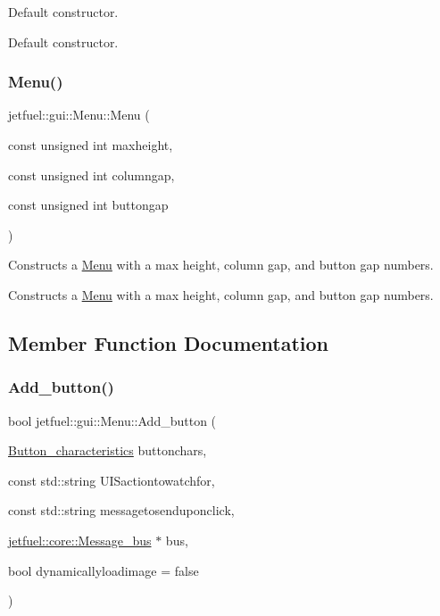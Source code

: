 Default constructor. 

Default constructor. \mbox{\label{classjetfuel_1_1gui_1_1Menu_ae09bc951a919594033f94c5d827889d1}} 
\subsubsection{\texorpdfstring{Menu()}{Menu()}\hspace{0.1cm}{\footnotesize\ttfamily [2/2]}}
{\footnotesize\ttfamily jetfuel\+::gui\+::\+Menu\+::\+Menu (\begin{DoxyParamCaption}\item[{const unsigned int}]{maxheight,  }\item[{const unsigned int}]{columngap,  }\item[{const unsigned int}]{buttongap }\end{DoxyParamCaption})\hspace{0.3cm}{\ttfamily [inline]}}



Constructs a \hyperlink{classjetfuel_1_1gui_1_1Menu}{Menu} with a max height, column gap, and button gap numbers. 

Constructs a \hyperlink{classjetfuel_1_1gui_1_1Menu}{Menu} with a max height, column gap, and button gap numbers. 

\subsection{Member Function Documentation}
\mbox{\label{classjetfuel_1_1gui_1_1Menu_a6f0162b01dbf0bd6bf65cfb3712499fc}} 
\subsubsection{\texorpdfstring{Add\+\_\+button()}{Add\_button()}}
{\footnotesize\ttfamily bool jetfuel\+::gui\+::\+Menu\+::\+Add\+\_\+button (\begin{DoxyParamCaption}\item[{\hyperlink{structjetfuel_1_1gui_1_1Menu_1_1Button__characteristics}{Button\+\_\+characteristics}}]{buttonchars,  }\item[{const std\+::string}]{U\+I\+Sactiontowatchfor,  }\item[{const std\+::string}]{messagetosenduponclick,  }\item[{\hyperlink{classjetfuel_1_1core_1_1Message__bus}{jetfuel\+::core\+::\+Message\+\_\+bus} $\ast$}]{bus,  }\item[{bool}]{dynamicallyloadimage = {\ttfamily false} }\end{DoxyParamCaption})}



